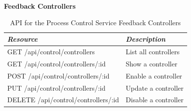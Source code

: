       \begin{minipage}{\linewidth}
      \large{\textbf{Feedback Controllers}}

      \begin{table}[H]
        \centering
        \begin{tabular}{p{3in} p{3in}}
          \toprule
          \emph{Resource} & \emph{Description} \\ [0.5ex]
          \midrule
          GET /api/control/controllers & List all controllers \\
          GET /api/control/controllers/:id & Show a controller \\
          POST /api/control/controllers/:id & Enable a controller \\
          PUT /api/control/controllers/:id & Update a controller \\
          DELETE /api/control/controllers/:id & Disable a controller \\
          \bottomrule
        \end{tabular}
        \caption{API for the Process Control Service Feedback Controllers}\label{tab:rest-control-controllers}
      \end{table}
      \end{minipage}
